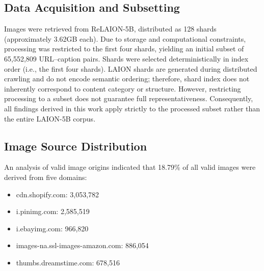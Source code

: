 %
%
%





\subsection{Data Acquisition and Subsetting}

Images were retrieved from ReLAION-5B, distributed as 128 shards (approximately 3.62GB each). Due to storage and computational constraints, processing was restricted to the first four shards, yielding an initial subset of 65,552,809 URL--caption pairs. Shards were selected deterministically in index order (i.e., the first four shards). LAION shards are generated during distributed crawling and do not encode semantic ordering; therefore, shard index does not inherently correspond to content category or structure. However, restricting processing to a subset does not guarantee full representativeness. Consequently, all findings derived in this work apply strictly to the processed subset rather than the entire LAION-5B corpus.

\subsection{Image Source Distribution}

An analysis of valid image origins indicated that 18.79\% of all valid images were derived from five domains:
\begin{itemize}
	\item cdn.shopify.com: 3,053,782
	\item i.pinimg.com: 2,585,519
	\item i.ebayimg.com: 966,820
	\item images-na.ssl-images-amazon.com: 886,054
	\item thumbs.dreamstime.com: 678,516
\end{itemize}

